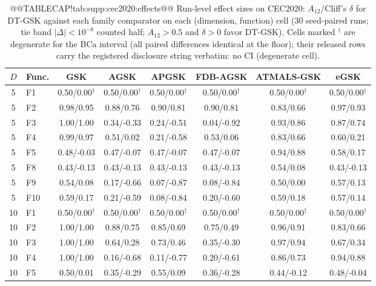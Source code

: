 \documentclass[10pt,a4paper]{article}
\newcommand{\dtgsk}{DT-GSK}
\begin{document}
\begin{table}[p]
\caption{@@TABLECAP!tab:supp:cec2020:effects@@ Run-level effect sizes on CEC2020: $A_{12}$/Cliff's $\delta$
for \dtgsk{} against each family comparator on each (dimension,
function) cell (30 seed-paired runs; tie band $|\Delta| < 10^{-8}$
counted half; $A_{12} > 0.5$ and $\delta > 0$ favor \dtgsk{}).  Cells
marked $^{\dagger}$ are degenerate for the BCa interval (all paired
differences identical at the floor); their released rows carry the
registered disclosure string verbatim: no CI (degenerate cell).
}\label{tab:supp:cec2020:effects}



\zebra
\begin{tabular}{clcccccc}
\toprule
\textbf{$D$} & \textbf{Func.} & \textbf{GSK} & \textbf{AGSK} & \textbf{APGSK} & \textbf{FDB-AGSK} & \textbf{ATMALS-GSK} & \textbf{eGSK} \\
\midrule
5 & F1 & 0.50/0.00$^{\dagger}$ & 0.50/0.00$^{\dagger}$ & 0.50/0.00$^{\dagger}$ & 0.50/0.00$^{\dagger}$ & 0.50/0.00$^{\dagger}$ & 0.50/0.00$^{\dagger}$ \\
5 & F2 & 0.98/0.95 & 0.88/0.76 & 0.90/0.81 & 0.90/0.81 & 0.83/0.66 & 0.97/0.93 \\
5 & F3 & 1.00/1.00 & 0.34/-0.33 & 0.24/-0.51 & 0.04/-0.92 & 0.93/0.86 & 0.87/0.74 \\
5 & F4 & 0.99/0.97 & 0.51/0.02 & 0.21/-0.58 & 0.53/0.06 & 0.83/0.66 & 0.60/0.21 \\
5 & F5 & 0.48/-0.03 & 0.47/-0.07 & 0.47/-0.07 & 0.47/-0.07 & 0.94/0.88 & 0.58/0.17 \\
5 & F8 & 0.43/-0.13 & 0.43/-0.13 & 0.43/-0.13 & 0.43/-0.13 & 0.54/0.08 & 0.43/-0.13 \\
5 & F9 & 0.54/0.08 & 0.17/-0.66 & 0.07/-0.87 & 0.08/-0.84 & 0.50/0.00 & 0.57/0.13 \\
5 & F10 & 0.59/0.17 & 0.21/-0.59 & 0.08/-0.84 & 0.20/-0.60 & 0.59/0.18 & 0.57/0.14 \\
\midrule
10 & F1 & 0.50/0.00$^{\dagger}$ & 0.50/0.00$^{\dagger}$ & 0.50/0.00$^{\dagger}$ & 0.50/0.00$^{\dagger}$ & 0.50/0.00$^{\dagger}$ & 0.50/0.00$^{\dagger}$ \\
10 & F2 & 1.00/1.00 & 0.88/0.75 & 0.85/0.69 & 0.75/0.49 & 0.96/0.91 & 0.83/0.66 \\
10 & F3 & 1.00/1.00 & 0.64/0.28 & 0.73/0.46 & 0.35/-0.30 & 0.97/0.94 & 0.67/0.34 \\
10 & F4 & 1.00/1.00 & 0.16/-0.68 & 0.11/-0.77 & 0.20/-0.61 & 0.86/0.73 & 0.94/0.88 \\
10 & F5 & 0.50/0.01 & 0.35/-0.29 & 0.55/0.09 & 0.36/-0.28 & 0.44/-0.12 & 0.48/-0.04 \\

\end{tabular}
\end{table}
\end{document}
